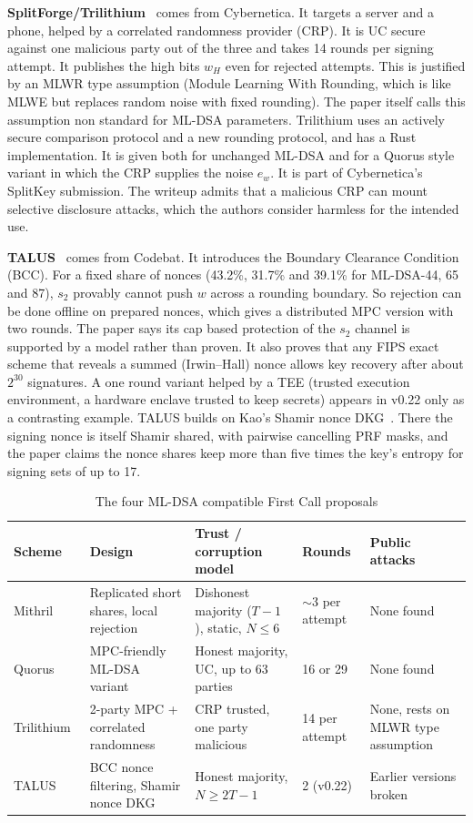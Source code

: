 \documentclass[10pt,conference,a4paper]{IEEEtran}
\begin{document}
\textbf{SplitForge/Trilithium}~\cite{trilithium} comes from Cybernetica. It targets a server and a phone, helped by a
correlated randomness provider (CRP). It is UC secure against one malicious party out of the three and takes 14 rounds per
signing attempt. It publishes the high bits $w_H$ even for rejected attempts. This is justified by an MLWR type assumption
(Module Learning With Rounding, which is like MLWE but replaces random noise with fixed rounding). The paper itself calls
this assumption non standard for ML-DSA parameters. Trilithium uses an actively secure comparison protocol and a new
rounding protocol, and has a Rust implementation. It is given both for unchanged ML-DSA and for a Quorus style variant in
which the CRP supplies the noise $e_w$. It is part of Cybernetica's SplitKey submission. The writeup admits that a
malicious CRP can mount selective disclosure attacks, which the authors consider harmless for the intended use.

\textbf{TALUS}~\cite{talus,taluspw} comes from Codebat. It introduces the Boundary Clearance Condition (BCC). For a fixed
share of nonces (43.2\%, 31.7\% and 39.1\% for ML-DSA-44, 65 and 87), $s_2$ provably cannot push $w$ across a rounding
boundary. So rejection can be done offline on prepared nonces, which gives a distributed MPC version with two rounds. The
paper says its cap based protection of the $s_2$ channel is supported by a model rather than proven. It also proves that any
FIPS exact scheme that reveals a summed (Irwin--Hall) nonce allows key recovery after about $2^{30}$ signatures. A one
round variant helped by a TEE (trusted execution environment, a hardware enclave trusted to keep secrets) appears in v0.22
only as a contrasting example. TALUS builds on Kao's Shamir nonce DKG~\cite{kao}. There the signing nonce is itself Shamir
shared, with pairwise cancelling PRF masks, and the paper claims the nonce shares keep more than five times the key's
entropy for signing sets of up to 17.

\begin{table}[t]
\caption{The four ML-DSA compatible First Call proposals}\label{tab:schemes}
\centering\footnotesize
\begin{tabularx}{\textwidth}{@{}lXXlX@{}}
\toprule
Scheme & Design & Trust / corruption model & Rounds & Public attacks\\
\midrule
Mithril~\cite{mithril} & Replicated short shares, local rejection & Dishonest majority ($T-1$), static, $N\le6$ & $\sim$3 per attempt & None found\\
Quorus~\cite{quorus} & MPC-friendly ML-DSA variant & Honest majority, UC, up to 63 parties & 16 or 29 & None found\\
Trilithium~\cite{trilithium} & 2-party MPC + correlated randomness & CRP trusted, one party malicious & 14 per attempt & None, rests on MLWR type assumption\\
TALUS~\cite{talus,taluspw} & BCC nonce filtering, Shamir nonce DKG & Honest majority, $N\ge 2T-1$ & 2 (v0.22) & Earlier versions broken~\cite{niot}\\
\bottomrule
\end{tabularx}
\end{table}
\end{document}
